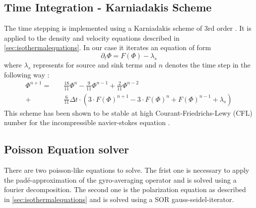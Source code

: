 \documentclass[master.tex]{subfiles}
\begin{document}
\subsection{Time Integration - Karniadakis Scheme}
The time stepping is implemented using a Karniadakis scheme of 3rd order \cite{KARNIADAKIS1991414}.
It is applied to the density and velocity equations described in \autoref{sec:isothermalequations}.
In our case it iterates an equation of form
\begin{equation}
    \partial_t \Phi = F(\Phi) - \lambda_s
\end{equation}
where $\lambda_s$ represents for source and sink terms and $n$ denotes the time step in the following way :
\begin{equation}\label{eq:karnidakis-scheme}
\begin{split}
    \Phi^{n + 1} = \quad &\frac{18}{11} \Phi^{n} - \frac{9}{11} \Phi^{n-1} + \frac{2}{11}  \Phi^{n-2}\\
     + &\frac{6}{11}\Delta t \cdot (3 \cdot F(\Phi)^{n+1} - 3 \cdot F(\Phi)^{n} + F(\Phi)^{n-1} + \lambda_s)
\end{split}
\end{equation}
This scheme has been shown to be stable at high Courant-Friedrichs-Lewy (CFL) number for the incompressible navier-stokes equation \cite{KARNIADAKIS1991414}.

\subsection{Poisson Equation solver}
There are two poisson-like equations to solve. The frist one is necessary to apply the padé-approximation of the gyro-averaging operator and is solved using a fourier decomposition. The second one is the polarization equation as described in \autoref{sec:isothermalequations} and is solved using a \ac{SOR} gauss-seidel-iterator.
\end{document}
